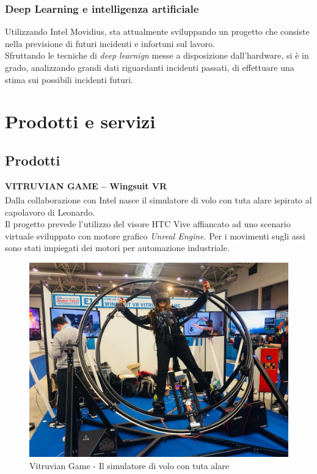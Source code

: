 \subsubsection{Deep Learning e intelligenza artificiale}
Utilizzando Intel Movidius, \lab{} sta attualmente sviluppando un progetto che consiste nella previsione di futuri incidenti e infortuni sul lavoro.\\
Sfruttando le tecniche di \textit{deep learnign} messe a disposizione dall'hardware, si è in grado, analizzando grandi dati riguardanti incidenti passati, di effettuare una stima sui possibili incidenti futuri.

\newpage
\section{Prodotti e servizi}
\subsection{Prodotti}
\textbf{VITRUVIAN GAME – Wingsuit VR}
\\
Dalla collaborazione con Intel\textsuperscript{\textregistered} nasce il simulatore di volo con tuta alare ispirato al capolavoro di Leonardo.\\
Il progetto prevede l'utilizzo del visore HTC Vive affiancato ad uno scenario virtuale sviluppato con motore grafico \textit{Unreal Engine}. Per i movimenti sugli assi sono stati impiegati dei motori per automazione industriale.
\\
\begin{figure}[H]
	\begin{center}
	\includegraphics[scale=0.15]{immagini/vitruvian.jpg}
	\caption{Vitruvian Game - Il simulatore di volo con tuta alare}
	\end{center}
\end{figure}

